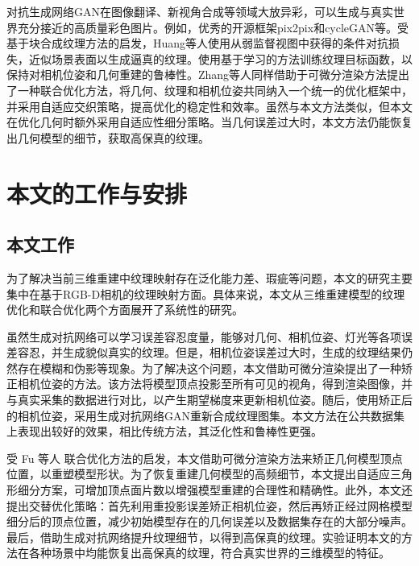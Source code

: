 \vspace*{2mm}对抗生成网络GAN在图像翻译、新视角合成等领域大放异彩，可以生成与真实世界充分接近的高质量彩色图片。例如，优秀的开源框架pix2pix和cycleGAN等。受基于块合成纹理方法的启发，Huang等人使用从弱监督视图中获得的条件对抗损失，近似场景表面以生成逼真的纹理。使用基于学习的方法训练纹理目标函数，以保持对相机位姿和几何重建的鲁棒性。Zhang等人同样借助于可微分渲染方法提出了一种联合优化方法，将几何、纹理和相机位姿共同纳入一个统一的优化框架中，并采用自适应交织策略，提高优化的稳定性和效率。虽然与本文方法类似，但本文在优化几何时额外采用自适应性细分策略。当几何误差过大时，本文方法仍能恢复出几何模型的细节，获取高保真的纹理。
\section{本文的工作与安排}

\subsection{本文工作}
为了解决当前三维重建中纹理映射存在泛化能力差、瑕疵等问题，本文的研究主要集中在基于RGB-D相机的纹理映射方面。具体来说，本文从三维重建模型的纹理优化和联合优化两个方面展开了系统性的研究。\par

虽然生成对抗网络可以学习误差容忍度量，能够对几何、相机位姿、灯光等各项误差容忍，并生成貌似真实的纹理。但是，相机位姿误差过大时，生成的纹理结果仍然存在模糊和伪影等现象。为了解决这个问题，本文借助可微分渲染提出了一种矫正相机位姿的方法。该方法将模型顶点投影至所有可见的视角，得到渲染图像，并与真实采集的数据进行对比，以产生期望梯度来更新相机位姿。随后，使用矫正后的相机位姿，采用生成对抗网络GAN重新合成纹理图集。本文方法在公共数据集上表现出较好的效果，相比传统方法，其泛化性和鲁棒性更强。\par

受 Fu 等人 联合优化方法的启发，本文借助可微分渲染方法来矫正几何模型顶点位置，以重塑模型形状。为了恢复重建几何模型的高频细节，本文提出自适应三角形细分方案，可增加顶点面片数以增强模型重建的合理性和精确性。此外，本文还提出交替优化策略：首先利用重投影误差矫正相机位姿，然后再矫正经过网格模型细分后的顶点位置，减少初始模型存在的几何误差以及数据集存在的大部分噪声。最后，借助生成对抗网络提升纹理细节，以得到高保真的纹理。实验证明本文的方法在各种场景中均能恢复出高保真的纹理，符合真实世界的三维模型的特征。

